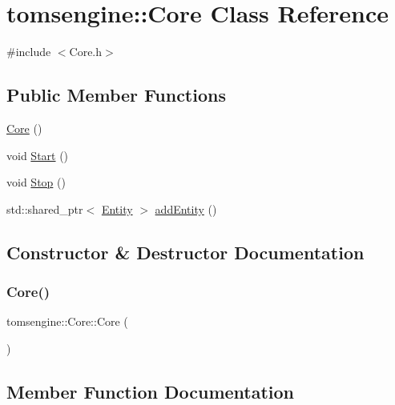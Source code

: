 \hypertarget{classtomsengine_1_1_core}{}\section{tomsengine\+:\+:Core Class Reference}
\label{classtomsengine_1_1_core}


{\ttfamily \#include $<$Core.\+h$>$}

\subsection*{Public Member Functions}
\begin{DoxyCompactItemize}
\item 
\mbox{\hyperlink{classtomsengine_1_1_core_ad9b06b4a017762ce277c705d01922b5f}{Core}} ()
\item 
void \mbox{\hyperlink{classtomsengine_1_1_core_ad5e2c3d2900bef9155f9ee97eb9cdce4}{Start}} ()
\item 
void \mbox{\hyperlink{classtomsengine_1_1_core_a556fb0bd37ba3cef6a2b691f306538e6}{Stop}} ()
\item 
std\+::shared\+\_\+ptr$<$ \mbox{\hyperlink{classtomsengine_1_1_entity}{Entity}} $>$ \mbox{\hyperlink{classtomsengine_1_1_core_adefc590c422c9fa8559211fe8d0599de}{add\+Entity}} ()
\end{DoxyCompactItemize}


\subsection{Constructor \& Destructor Documentation}
\mbox{\label{classtomsengine_1_1_core_ad9b06b4a017762ce277c705d01922b5f}} 
\subsubsection{\texorpdfstring{Core()}{Core()}}
{\footnotesize\ttfamily tomsengine\+::\+Core\+::\+Core (\begin{DoxyParamCaption}{ }\end{DoxyParamCaption})}



\subsection{Member Function Documentation}
\mbox{\label{classtomsengine_1_1_core_adefc590c422c9fa8559211fe8d0599de}} 
